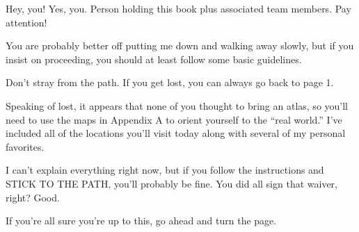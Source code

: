 \pagestyle{empty}
\vspace*{\fill}
Hey, you! Yes, you. Person holding this book plus associated team members. Pay attention!

You are probably better off putting me down and walking away slowly, but if you insist on proceeding, you should at least follow some basic guidelines.

Don't stray from the path. If you get lost, you can always go back to page 1.

Speaking of lost, it appears that none of you thought to bring an atlas, so you'll need to use the maps in Appendix A to orient yourself to the ``real world.'' I've included all of the locations you'll visit today along with several of my personal favorites.

I can't explain everything right now, but if you follow the instructions and STICK TO THE PATH, you'll probably be fine. You did all sign that waiver, right? Good.

If you're all sure you're up to this, go ahead and turn the page.
\vspace*{\fill}
\newpage
\blankpage

